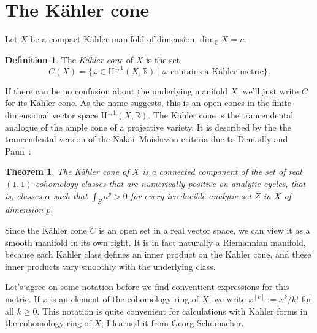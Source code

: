 \documentclass[11pt,a4paper]{amsart}
\newtheorem{theo}{Theorem}[section]
\theoremstyle{definition}
\newtheorem*{defi}{Definition}
\theoremstyle{remark}
\newcommand{\RR}{\mathbb{R}}
\newcommand{\CC}{\mathbb{C}}
\def\coho#1{\mathrm{H}^{#1}}
\def\kf{\omega}
\def\^#1{^{[#1]}}
\def\KC{C}
\begin{document}
\section{The K\"{a}hler cone}

Let $X$ be a compact K\"{a}hler manifold of dimension $\dim_{\CC} X = n$.

\begin{defi}
The \emph{K\"{a}hler cone} of $X$ is the set
\begin{equation*}
C(X) = \{ \kf \in \coho{1,1}(X,\RR) 
\mid
\text{$\kf$ contains a K\"{a}hler metric}
\}.
\end{equation*}
\end{defi}

If there can be no confusion about the underlying manifold $X$, we'll
just write $\KC$ for its K\"{a}hler cone.  As the name suggests, this is
an open cones in the finite-dimensional vector space
$\coho{1,1}(X,\RR)$. The K\"{a}hler cone is the trancendental analogue
of the ample cone of a projective variety. It is described by the the
trancendental version of the Nakai--Moishezon criteria due to Demailly
and Paun~\cite{DemaillyPaun}:


\begin{theo}
The K\"{a}hler cone of $X$ is a connected component of the set of real
$(1,1)$-cohomology classes that are numerically positive on analytic
cycles, that is, classes $\alpha$ such that $\int_{Z} a^p > 0$ for every
irreducible analytic set $Z$ in $X$ of dimension $p$.
\end{theo}



Since the K\"{a}hler cone $\KC$ is an open set in a real vector space,
we can view it as a smooth manifold in its own right. It is in fact
naturally a Riemannian manifold, because each Kahler class defines an
inner product on the Kahler cone, and these inner products vary smoothly
with the underlying class.


Let's agree on some notation before we find conventient expressions for
this metric. If $x$ is an element of the cohomology ring of $X$, we
write $x\^k := x^k/k!$ for all $k \geq 0$. This notation is
quite convenient for calculations with Kahler forms in the cohomology
ring of $X$; I learned it from Georg Schumacher.
\end{document}

